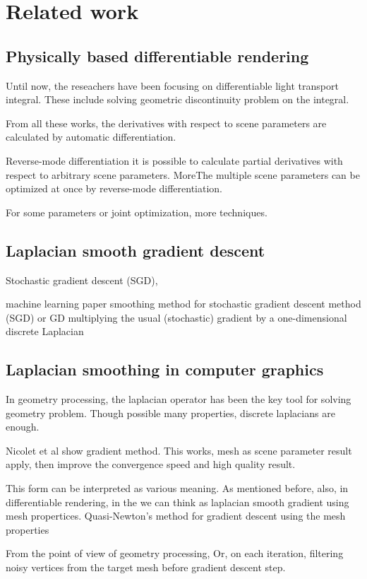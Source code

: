 \section*{Related work}\label{ch:ch2label}

\subsection*{Physically based differentiable rendering}

Until now, the reseachers have been focusing on differentiable light transport integral. 
These include solving geometric discontinuity problem on the integral\cite{li2018differentiable, loubet2019reparameterizing, zhang2020path}.

From all these works, the derivatives with respect to scene parameters are calculated by automatic differentiation.

Reverse-mode differentiation it is possible to calculate partial derivatives with respect to arbitrary scene parameters. MoreThe multiple scene parameters can be optimized at once by reverse-mode differentiation.

For some parameters or joint optimization, more techniques.

\subsection*{Laplacian smooth gradient descent}

Stochastic gradient descent (SGD), 

machine learning paper 
smoothing method for stochastic gradient descent method (SGD) or GD
multiplying the usual (stochastic) gradient by a one-dimensional discrete Laplacian

\subsection*{Laplacian smoothing in computer graphics}

In geometry processing, the laplacian operator has been the key tool for solving geometry problem. Though possible many properties, discrete laplacians are enough.

Nicolet et al\cite{Nicolet2021Large} show gradient method. This works, mesh as scene parameter result
~ apply, then improve the convergence speed and high quality result.

This form can be interpreted as various meaning. As mentioned before, 
also, in differentiable rendering, in the 
we can think as laplacian smooth gradient using mesh propertices. 
Quasi-Newton's method for gradient descent using the mesh properties

From the point of view of geometry processing,
Or, on each iteration, filtering noisy vertices from the target mesh before gradient descent step.







